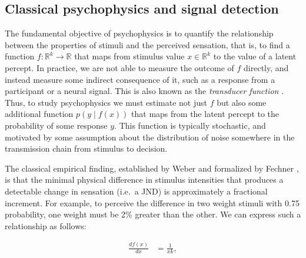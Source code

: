 \documentclass[../main.tex]{subfiles}
\begin{document}
\subsection{Classical psychophysics and signal detection}

The fundamental objective of psychophysics is to quantify the relationship between the properties of stimuli and the perceived sensation, that is, to find a function $f: \mathbb{R}^k\rightarrow \mathbb{R} $ that maps from stimulus value $x \in \mathbb{R}^k$ to the value of a latent percept. In practice, we are not able to measure the outcome of $f$ directly, and instead measure some indirect consequence of it, such as a response from a participant or a neural signal. This is also known as the \emph{transducer function} \citep{May2013}. Thus, to study psychophysics we must estimate not just $f$ but also some additional function $p(y\mid f(x))$ that maps from the latent percept to the probability of some response $y$. This function is typically stochastic, and motivated by some assumption about the distribution of noise somewhere in the transmission chain from stimulus to decision.

The classical empirical finding, established by Weber and formalized by Fechner \citep{fechner1966elements}, is that the minimal physical difference in stimulus intensities that produces a detectable change in sensation (i.e.\ a JND) is approximately a fractional increment. For example, to perceive the difference in two weight stimuli with 0.75 probability, one weight must be 2\% greater than the other. We can express such a relationship as follows:

\begin{align} \label{eqn:fechner}
\frac{df(x)}{dx} &= \frac{1}{xk},
\end{align}
\end{document}

